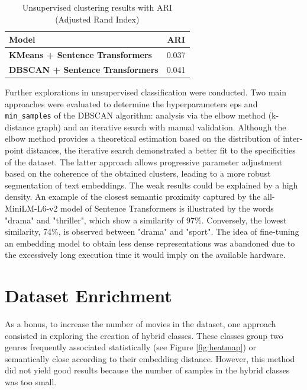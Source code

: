 \documentclass[12pt]{report}
\begin{document}
\begin{table}[H]
\centering
\begin{tabular}{|l|c|}
\hline
\textbf{Model} & \textbf{ARI} \\
\hline
\textbf{KMeans + Sentence Transformers}  & 0.037 \\
\textbf{DBSCAN + Sentence Transformers}  & 0.041 \\
\hline
\end{tabular}
\caption{Unsupervised clustering results with ARI (Adjusted Rand Index)}
\label{tab:clustering_ari}
\end{table}

Further explorations in unsupervised classification were conducted. Two main approaches were evaluated to determine the hyperparameters eps and \texttt{min\_samples} of the DBSCAN algorithm: analysis via the elbow method (k-distance graph) and an iterative search with manual validation. Although the elbow method provides a theoretical estimation based on the distribution of inter-point distances, the iterative search demonstrated a better fit to the specificities of the dataset. The latter approach allows progressive parameter adjustment based on the coherence of the obtained clusters, leading to a more robust segmentation of text embeddings. The weak results could be explained by a high density. An example of the closest semantic proximity captured by the all-MiniLM-L6-v2 model of Sentence Transformers is illustrated by the words "drama" and "thriller", which show a similarity of 97\%. Conversely, the lowest similarity, 74\%, is observed between "drama" and "sport". The idea of fine-tuning an embedding model to obtain less dense representations was abandoned due to the excessively long execution time it would imply on the available hardware. 


\vspace{1.5\baselineskip}

\section{Dataset Enrichment}

As a bonus, to increase the number of movies in the dataset, one approach consisted in exploring the creation of hybrid classes. These classes group two genres frequently associated statistically (see Figure \ref{fig:heatmap}) or semantically close according to their embedding distance. However, this method did not yield good results because the number of samples in the hybrid classes was too small. 
\end{document}
